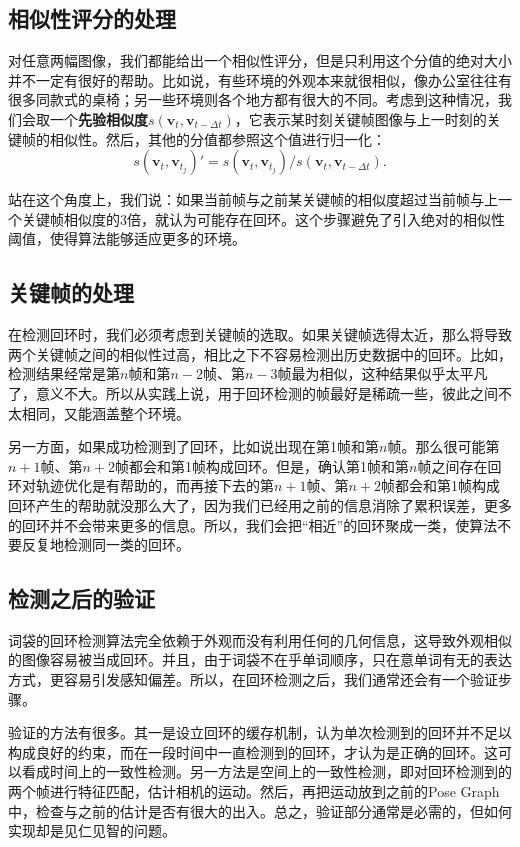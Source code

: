\subsection{相似性评分的处理}
对任意两幅图像，我们都能给出一个相似性评分，但是只利用这个分值的绝对大小并不一定有很好的帮助。比如说，有些环境的外观本来就很相似，像办公室往往有很多同款式的桌椅；另一些环境则各个地方都有很大的不同。考虑到这种情况，我们会取一个\textbf{先验相似度}$s\left( \bm{v}_t, \bm{v}_{t-\Delta t}\right)$，它表示某时刻关键帧图像与上一时刻的关键帧的相似性。然后，其他的分值都参照这个值进行归一化：
\begin{equation}
s\left( \bm{v}_t, \bm{v}_{t_j}\right)' = s\left( \bm{v}_t, \bm{v}_{t_j}\right) / s\left( \bm{v}_t, \bm{v}_{t-\Delta t}\right).
\end{equation}

站在这个角度上，我们说：如果当前帧与之前某关键帧的相似度超过当前帧与上一个关键帧相似度的3倍，就认为可能存在回环。这个步骤避免了引入绝对的相似性阈值，使得算法能够适应更多的环境。
\enlargethispage{-5pt}
\subsection{关键帧的处理}
在检测回环时，我们必须考虑到关键帧的选取。如果关键帧选得太近，那么将导致两个关键帧之间的相似性过高，相比之下不容易检测出历史数据中的回环。比如，检测结果经常是第$n$帧和第$n-2$帧、第$n-3$帧最为相似，这种结果似乎太平凡了，意义不大。所以从实践上说，用于回环检测的帧最好是稀疏一些，彼此之间不太相同，又能涵盖整个环境。

另一方面，如果成功检测到了回环，比如说出现在第1帧和第$n$帧。那么很可能第$n+1$帧、第$n+2$帧都会和第1帧构成回环。但是，确认第1帧和第$n$帧之间存在回环对轨迹优化是有帮助的，而再接下去的第$n+1$帧、第$n+2$帧都会和第1帧构成回环产生的帮助就没那么大了，因为我们已经用之前的信息消除了累积误差，更多的回环并不会带来更多的信息。所以，我们会把“相近”的回环聚成一类，使算法不要反复地检测同一类的回环。

\subsection{检测之后的验证}
词袋的回环检测算法完全依赖于外观而没有利用任何的几何信息，这导致外观相似的图像容易被当成回环。并且，由于词袋不在乎单词顺序，只在意单词有无的表达方式，更容易引发感知偏差。所以，在回环检测之后，我们通常还会有一个验证步骤\textsuperscript{\cite{Latif2013, Cadena2012}}。

验证的方法有很多。其一是设立回环的缓存机制，认为单次检测到的回环并不足以构成良好的约束，而在一段时间中一直检测到的回环，才认为是正确的回环。这可以看成时间上的一致性检测。另一方法是空间上的一致性检测，即对回环检测到的两个帧进行特征匹配，估计相机的运动。然后，再把运动放到之前的Pose Graph中，检查与之前的估计是否有很大的出入。总之，验证部分通常是必需的，但如何实现却是见仁见智的问题。

